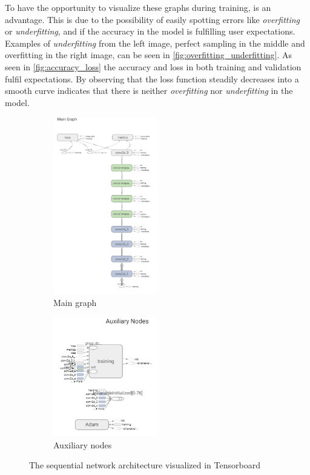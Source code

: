 \documentclass[USenglish]{ifimaster}  %
\begin{document}
To have the opportunity to visualize these graphs during training, is an advantage. This is due to the possibility of easily spotting errors like \textit{overfitting} or \textit{underfitting}, and if the accuracy in the model is fulfilling user expectations. Examples of \textit{underfitting} from the left image, perfect sampling in the middle and overfitting in the right image, can be seen in \cref{fig:overfitting_underfitting}. As seen in \cref{fig:accuracy_loss} the accuracy and loss in both training and validation fulfil expectations. 
By observing that the loss function steadily decreases into a smooth curve indicates that there is neither \textit{overfitting} nor \textit{underfitting} in the model.

\begin{figure}[ht]
\centering
\begin{subfigure}[b]{\textwidth}
\centering
\includegraphics[width=0.5\textwidth]{bilder/tensorboard_graph_1.PNG}
\caption{Main graph}
\end{subfigure}
\hfill
\begin{subfigure}[b]{\textwidth}
\centering
\includegraphics[width=0.5\textwidth]{bilder/tensorboard_graph_2.PNG}
\caption{Auxiliary nodes}
\end{subfigure}
\caption{The sequential network architecture visualized in Tensorboard}
\label{fig:graph}
\end{figure}
\end{document}
